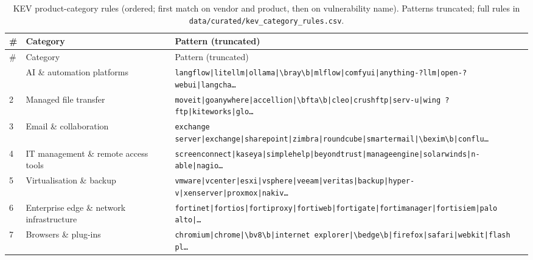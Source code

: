 \begin{longtable}{p{}p{}p{}}
\caption{KEV product-category rules (ordered; first match on vendor and product, then on vulnerability name). Patterns truncated; full rules in \texttt{data/curated/kev\_category\_rules.csv}.}\label{tab:rules}\\
\toprule
\# & Category & Pattern (truncated) \\
\midrule
\endfirsthead
\toprule
\# & Category & Pattern (truncated) \\
\midrule
\endhead
\bottomrule
\endfoot
1 & AI \& automation platforms & \texttt{langflow|\allowbreak{}litellm|\allowbreak{}ollama|\allowbreak{}\textbackslash{}bray\textbackslash{}b|\allowbreak{}mlflow|\allowbreak{}comfyui|\allowbreak{}anything-?llm|\allowbreak{}open-?webui|\allowbreak{}langcha\ldots} \\
2 & Managed file transfer & \texttt{moveit|\allowbreak{}goanywhere|\allowbreak{}accellion|\allowbreak{}\textbackslash{}bfta\textbackslash{}b|\allowbreak{}cleo|\allowbreak{}crushftp|\allowbreak{}serv-u|\allowbreak{}wing ?ftp|\allowbreak{}kiteworks|\allowbreak{}glo\ldots} \\
3 & Email \& collaboration & \texttt{exchange server|\allowbreak{}exchange|\allowbreak{}sharepoint|\allowbreak{}zimbra|\allowbreak{}roundcube|\allowbreak{}smartermail|\allowbreak{}\textbackslash{}bexim\textbackslash{}b|\allowbreak{}conflu\ldots} \\
4 & IT management \& remote access tools & \texttt{screenconnect|\allowbreak{}kaseya|\allowbreak{}simplehelp|\allowbreak{}beyondtrust|\allowbreak{}manageengine|\allowbreak{}solarwinds|\allowbreak{}n-able|\allowbreak{}nagio\ldots} \\
5 & Virtualisation \& backup & \texttt{vmware|\allowbreak{}vcenter|\allowbreak{}esxi|\allowbreak{}vsphere|\allowbreak{}veeam|\allowbreak{}veritas|\allowbreak{}backup|\allowbreak{}hyper-v|\allowbreak{}xenserver|\allowbreak{}proxmox|\allowbreak{}nakiv\ldots} \\
6 & Enterprise edge \& network infrastructure & \texttt{fortinet|\allowbreak{}fortios|\allowbreak{}fortiproxy|\allowbreak{}fortiweb|\allowbreak{}fortigate|\allowbreak{}fortimanager|\allowbreak{}fortisiem|\allowbreak{}palo alto|\allowbreak{}\ldots} \\
7 & Browsers \& plug-ins & \texttt{chromium|\allowbreak{}chrome|\allowbreak{}\textbackslash{}bv8\textbackslash{}b|\allowbreak{}internet explorer|\allowbreak{}\textbackslash{}bedge\textbackslash{}b|\allowbreak{}firefox|\allowbreak{}safari|\allowbreak{}webkit|\allowbreak{}flash pl\ldots} \\

\end{longtable}
